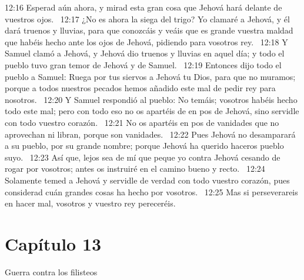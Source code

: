 12:16 Esperad aún ahora, y mirad esta gran cosa que Jehová hará delante de vuestros ojos.  
12:17 ¿No es ahora la siega del trigo? Yo clamaré a Jehová, y él dará truenos y lluvias, para que conozcáis y veáis que es grande vuestra maldad que habéis hecho ante los ojos de Jehová, pidiendo para vosotros rey.  
12:18 Y Samuel clamó a Jehová, y Jehová dio truenos y lluvias en aquel día; y todo el pueblo tuvo gran temor de Jehová y de Samuel.  
12:19 Entonces dijo todo el pueblo a Samuel: Ruega por tus siervos a Jehová tu Dios, para que no muramos; porque a todos nuestros pecados hemos añadido este mal de pedir rey para nosotros.  
12:20 Y Samuel respondió al pueblo: No temáis; vosotros habéis hecho todo este mal; pero con todo eso no os apartéis de en pos de Jehová, sino servidle con todo vuestro corazón.  
12:21 No os apartéis en pos de vanidades que no aprovechan ni libran, porque son vanidades.  
12:22 Pues Jehová no desamparará a su pueblo, por su grande nombre; porque Jehová ha querido haceros pueblo suyo.  
12:23 Así que, lejos sea de mí que peque yo contra Jehová cesando de rogar por vosotros; antes os instruiré en el camino bueno y recto.  
12:24 Solamente temed a Jehová y servidle de verdad con todo vuestro corazón, pues considerad cuán grandes cosas ha hecho por vosotros.  
12:25 Mas si perseverareis en hacer mal, vosotros y vuestro rey pereceréis.  
\section*{Capítulo 13}
Guerra contra los filisteos  

